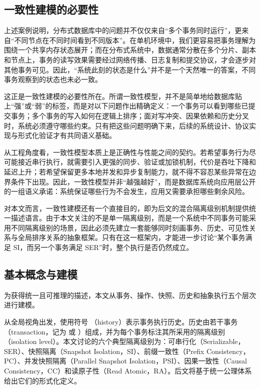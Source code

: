 \subsection{一致性建模的必要性}
上述案例说明，分布式数据库中的问题并不仅仅来自“多个事务同时运行”，更来自“不同节点在不同时间看到不同版本”。在单机环境中，我们更容易把事务理解为围绕一个共享内存状态展开；而在分布式系统中，数据通常分散在多个分片、副本和节点上，事务的读写效果需要经过网络传播、日志复制和提交协议，才会逐步对其他事务可见。因此，“系统此刻的状态是什么”并不是一个天然唯一的答案，不同事务观察到的状态也未必一致。

这正是一致性建模的必要性所在。所谓一致性模型，并不是简单地给数据库贴上“强”或“弱”的标签，而是对以下问题作出精确定义：一个事务可以看到哪些已提交事务；多个事务的写入如何在逻辑上排序；面对写冲突、因果依赖和历史分叉时，系统必须遵守哪些约束。只有把这些问题明确下来，后续的系统设计、协议实现与形式化验证才有共同语义基础。

从工程角度看，一致性模型本质上是正确性与性能之间的契约。若希望事务行为尽可能接近串行执行，就需要引入更强的同步、验证或加锁机制，代价是吞吐下降和延迟上升；若希望保留更多本地并发和异步复制能力，就不得不容忍某些异常在边界条件下出现。因此，一致性模型并非“越强越好”，而是数据库系统向应用层公开的一组语义承诺：系统保证哪些行为不会发生，应用又需要承担哪些剩余风险。

对本文而言，一致性建模还有一个直接目的，即为后文的混合隔离级别机制提供统一描述语言。由于本文关注的不是单一隔离级别，而是一个系统中不同事务可能采用不同隔离级别的场景，因此必须先建立一套能够同时刻画事务、历史、可见性关系与全局排序关系的抽象框架。只有在这一框架内，才能进一步讨论“某个事务满足 SI，而另一个事务满足 SER”时，整个执行是否仍然成立。

\subsection{基本概念与建模}
为获得统一且可推理的描述，本文从事务、操作、快照、历史和抽象执行五个层次进行建模。

从全局视角出发，使用符号 \History（history）表示事务执行历史。历史由若干事务（transaction，记为 \Txc 或 \Txc[x]）组成，并为每个事务标注其所采用的隔离级别（isolation level）。本文讨论的六个典型隔离级别为：可串行化（Serializable，SER）、快照隔离（Snapshot Isolation，SI）、前缀一致性（Prefix Consistency，PC）、并发快照隔离（Parallel Snapshot Isolation，PSI）、因果一致性（Causal Consistency，CC）和读原子性（Read Atomic，RA）\cite{Schultz2015}。后文将基于统一公理体系给出它们的形式化定义。

